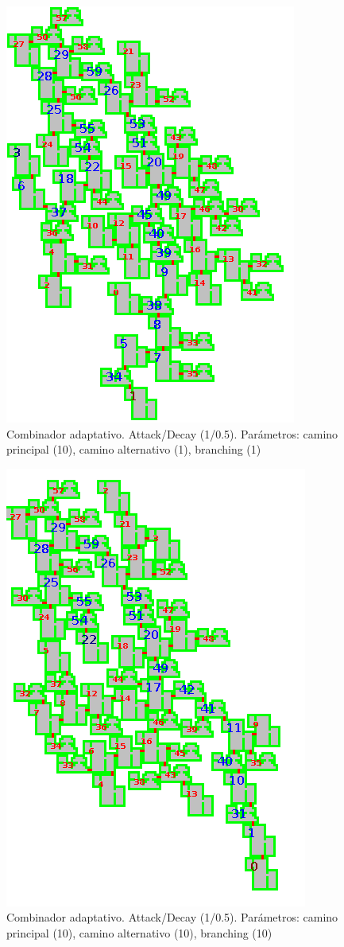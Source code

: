 \begin{figure}[H]
\centering
\includegraphics[scale=1]{img/mapsamples/adaptMAINaltbranch}
\caption{Combinador adaptativo. Attack/Decay (1/0.5). Parámetros: camino principal (10), camino alternativo (1), branching (1)
\label{fig:grfadaptMAINaltbranch}}
\end{figure}


\begin{figure}[H]
\centering
\includegraphics[scale=1]{img/mapsamples/adaptmainaltbranch}
\caption{Combinador adaptativo. Attack/Decay (1/0.5). Parámetros: camino principal (10), camino alternativo (10), branching (10)
\label{fig:grfadaptmainaltbranch}}
\end{figure}


